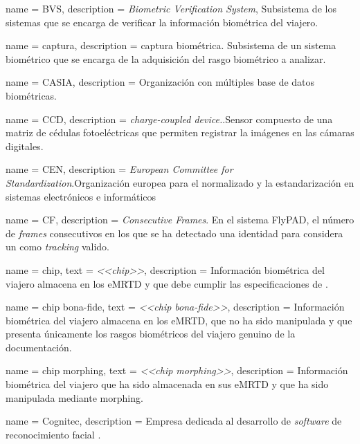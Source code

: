 {
    name        = BVS,
    description = {\textit{Biometric Verification System}, Subsistema de los sistemas  que se encarga de verificar la información biométrica del viajero.}
}

{
    name        = {captura},
    description = {captura biométrica. Subsistema de un sistema biométrico que se encarga de la adquisición del rasgo biométrico a analizar.}
}

{
    name        = {CASIA},
    description = {Organización con múltiples base de datos biométricas.}
}

{
    name        = {CCD},
    description = {\textit{charge-coupled device.}.Sensor compuesto de una matriz de cédulas fotoeléctricas que permiten registrar la imágenes en las cámaras digitales.}
}

{
    name        = {CEN},
    description = {\textit{European Committee for Standardization}.Organización europea para el normalizado y la estandarización en sistemas electrónicos e informáticos \cite{CENOnline}}
}

{
    name        = CF,
    description = {\textit{Consecutive Frames}. En el sistema \gls{FlyPAD}, el número de \textit{frames} consecutivos en los que se ha detectado una identidad para considera un  como \textit{tracking} valido.}
}

{
    name        = {chip},
    text        = \textit{<<chip>>},
    description = {Información biométrica del viajero almacena en los \gls{eMRTD} y que debe cumplir las especificaciones de  \cite{ICAOOnline}.}
}

{
    name        = {chip bona-fide},
    text        = \textit{<<chip \mbox{bona-fide}>>},
    description = {Información biométrica del viajero almacena en los \gls{eMRTD}, que no ha sido manipulada y que presenta únicamente los rasgos biométricos del viajero genuino de la documentación.}
}

{
    name        = {chip morphing},
    text        = \textit{<<chip morphing>>},
    description = {Información biométrica del viajero que ha sido almacenada en sus \gls{eMRTD} y que ha sido manipulada mediante \gls{morphing}.}
}

{
    name        = {Cognitec},
    description = {Empresa dedicada al desarrollo de \textit{software} de reconocimiento facial \cite{cognitec2019url}.}
}

